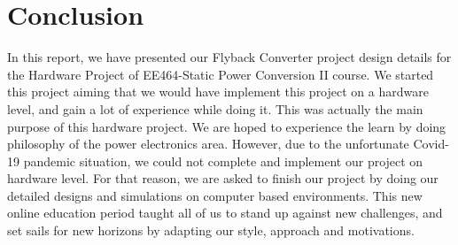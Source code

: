 \section{Conclusion}

In this report, we have presented our Flyback Converter project design details for the Hardware Project of EE464-Static Power Conversion II course. We started this project aiming that we would have implement this project on a hardware level, and gain a lot of experience while doing it. This was actually the main purpose of this hardware project. We are hoped to experience the learn by doing philosophy of the power electronics area. However, due to the unfortunate Covid-19 pandemic situation, we could not complete and implement our project on hardware level. For that reason, we are asked to finish our project by doing our detailed designs and simulations on computer based environments. This new online education period taught all of us to stand up against new challenges, and set sails for new horizons by adapting our style, approach and motivations.

